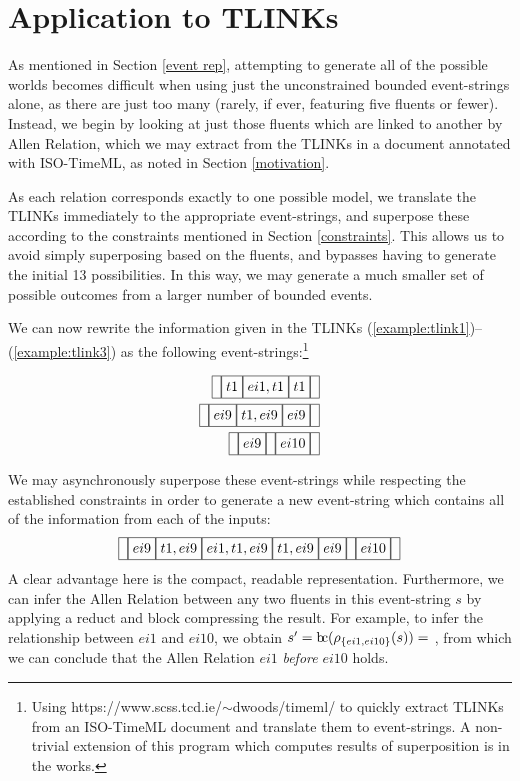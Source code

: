 \documentclass[a4paper,11pt,leqno]{article}
\newcommand{\bc}{{\rm b\!c}}
\newcommand{\vph}[1]{\vphantom{#1}}
\newcommand{\ebox}[1]{\fbox{$\vph{',}#1$}}
\begin{document}
\section{Application to TLINKs}\label{application}
As mentioned in Section \ref{event rep}, attempting to 
generate all of the possible worlds becomes difficult when using just the 
unconstrained bounded event-strings alone, as there are just too many (rarely, 
if ever, featuring five fluents or fewer). Instead, we begin by looking at just 
those fluents which are linked to another by Allen Relation, which we may 
extract from the TLINKs in a document annotated with ISO-TimeML, as noted in 
Section \ref{motivation}.

As each relation corresponds exactly to one possible model, we translate the 
TLINKs immediately to the appropriate event-strings, and superpose these 
according to the constraints mentioned in Section \ref{constraints}. This 
allows us to avoid simply superposing based on the fluents, and bypasses having 
to generate the initial 13 possibilities. In this way, we may generate a much 
smaller set of possible outcomes from a larger number of bounded events.

We can now rewrite the information given in the TLINKs 
(\ref{example:tlink1})--(\ref{example:tlink3}) as the following 
event-strings:\footnote{Using https://www.scss.tcd.ie/$\sim$dwoods/timeml/ to 
quickly extract TLINKs from an ISO-TimeML document and translate them to 
event-strings. A non-trivial extension of this program which computes results 
of superposition is in the works.}

\begin{subequations}
\begin{align}
\ebox{}\ebox{t1}\ebox{ei1,t1}\ebox{t1}\ebox{}\\
\ebox{}\ebox{ei9}\ebox{t1,ei9}\ebox{ei9}\ebox{}\\
\ebox{}\ebox{ei9}\ebox{}\ebox{ei10}\ebox{}
\end{align}
\end{subequations}

We may asynchronously superpose these event-strings while respecting the 
established constraints in order to generate a new event-string which contains 
all of the information from each of the inputs:
\begin{align}
\ebox{}\ebox{ei9}\ebox{t1,ei9}\ebox{ei1,t1,ei9}\ebox{t1,ei9}\ebox{ei9}\ebox{}\ebox{ei10}\ebox{}
\end{align}
A clear advantage here is the compact, readable representation. Furthermore, we 
can infer the Allen Relation between any two fluents in this event-string $s$ 
by applying a reduct and block compressing the result. For example, to infer the
relationship between $ei1$ and $ei10$, we obtain $s' = 
\bc{}(\rho_{\{ei1,ei10\}}(s)) = $ \ebox{}\ebox{ei1}\ebox{}\ebox{ei10}\ebox{}, 
from which we can conclude that the Allen Relation $ei1$ \textit{before} $ei10$ 
holds.
\end{document}
